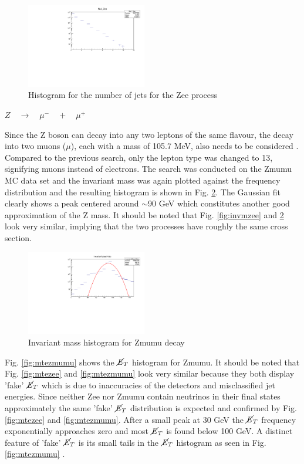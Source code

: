 \documentclass[runningheads,a4paper]{llncs}
\begin{document}
\begin{figure}
\centering
\includegraphics[height=3.7cm]{NoJ_Zee+new}
\caption{Histogram for the number of jets for the Zee process}
\label{fig:nojzee}
\end{figure}
\bigbreak
\begin{flushleft}
$Z\quad \rightarrow \quad { \mu  }^{ - }\quad +\quad { \mu  }^{ + }$
\end{flushleft}
\bigbreak
Since the Z boson can decay into any two leptons of the same flavour, the decay into two muons ($\mu$), each with a mass of 105.7 MeV, also needs to be considered \cite{Agashe:2014kda}. Compared to the previous search, only the lepton type was changed to 13, signifying muons instead of electrons. The search was conducted on the Zmumu MC data set and the invariant mass was again plotted against the frequency distribution and the resulting histogram is shown in Fig. \ref{fig:invmzmumu}. The Gaussian fit clearly shows a peak centered around $\sim$90 GeV which constitutes another good approximation of the Z mass. It should be noted that Fig. \ref{fig:invmzee} and \ref{fig:invmzmumu} look very similar, implying that the two processes have roughly the same cross section.\\

\begin{figure}
\centering
\includegraphics[height=3.7cm]{InvM_Zmumu_fit}
\caption{Invariant mass histogram for Zmumu decay}
\label{fig:invmzmumu}
\end{figure}

Fig. \ref{fig:mtezmumu} shows the $\cancel{\it{E}}_{T}$ histogram for Zmumu. It should be noted that Fig. \ref{fig:mtezee} and \ref{fig:mtezmumu} look very similar because they both display 'fake' $\cancel{\it{E}}_{T}$ which is due to inaccuracies of the detectors and misclassified jet energies. Since neither Zee nor Zmumu contain neutrinos in their final states approximately the same 'fake' $\cancel{\it{E}}_{T}$ distribution is expected and confirmed by Fig. \ref{fig:mtezee} and \ref{fig:mtezmumu}. After a small peak at 30 GeV the $\cancel{\it{E}}_{T}$ frequency exponentially approaches zero and most $\cancel{\it{E}}_{T}$ is found below 100 GeV. A distinct feature of 'fake' $\cancel{\it{E}}_{T}$ is its small tails in the $\cancel{\it{E}}_{T}$ histogram as seen in Fig. \ref{fig:mtezmumu} \cite{pizio2010missing}.\\
\end{document}
